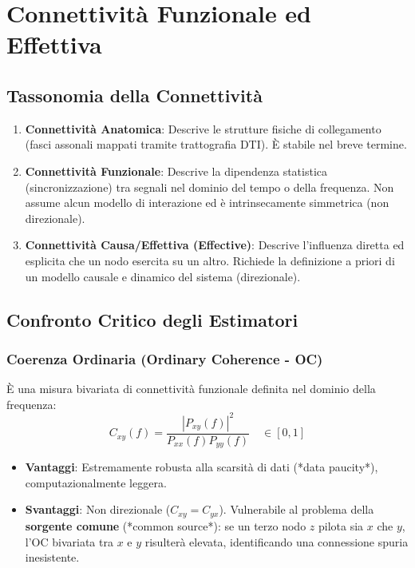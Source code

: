 \documentclass[10pt, letterpaper]{report}
\begin{document}
\chapter{Connettività Funzionale ed Effettiva}

\section{Tassonomia della Connettività}
\begin{enumerate}
    \item \textbf{Connettività Anatomica}: Descrive le strutture fisiche di collegamento (fasci assonali mappati tramite trattografia DTI).
    È stabile nel breve termine.
    \item \textbf{Connettività Funzionale}: Descrive la dipendenza statistica (sincronizzazione) tra segnali nel dominio del tempo o della frequenza.
    Non assume alcun modello di interazione ed è intrinsecamente simmetrica (non direzionale).
    \item \textbf{Connettività Causa/Effettiva (Effective)}: Descrive l'influenza diretta ed esplicita che un nodo esercita su un altro.
    Richiede la definizione a priori di un modello causale e dinamico del sistema (direzionale).
\end{enumerate}

\section{Confronto Critico degli Estimatori}

\subsection{Coerenza Ordinaria (Ordinary Coherence - OC)}
È una misura bivariata di connettività funzionale definita nel dominio della frequenza:
\[
C_{xy}(f) = \frac{|P_{xy}(f)|^2}{P_{xx}(f)P_{yy}(f)} \quad \in [0, 1]
\]
\begin{itemize}
    \item \textbf{Vantaggi}: Estremamente robusta alla scarsità di dati (*data paucity*), computazionalmente leggera.
    \item \textbf{Svantaggi}: Non direzionale ($C_{xy} = C_{yx}$). Vulnerabile al problema della \textbf{sorgente comune} (*common source*): se un terzo nodo $z$ pilota sia $x$ che $y$, l'OC bivariata tra $x$ e $y$ risulterà elevata, identificando una connessione spuria inesistente.
\end{itemize}
\end{document}
